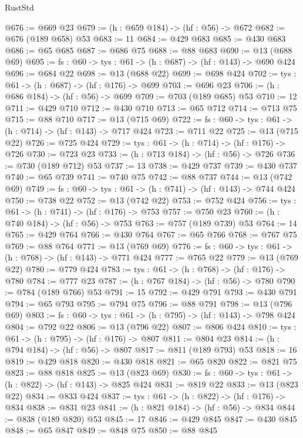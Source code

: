 \begin{lexlean}{RustStd}
\begin{coremodule}
@676 := @669 @23
@679 := (h : @659 @184) -> (hf : @56) -> @672
@682 := @676 (@189 @658) @53
@683 := 11
@684 := @429 @683
@685 := @430 @683
@686 := @65 @685
@687 := @686 @75
@688 := @88 @683
@690 := @13 (@688 @69)
@695 := {fs : @60} -> {tys : @61} -> (h : @687) -> (hf : @143) -> @690 @424
@696 := @684 @22
@698 := @13 (@688 @22)
@699 := @698 @424
@702 := {tys : @61} -> (h : @687) -> (hf : @176) -> @699
@703 := @696 @23
@706 := (h : @686 @184) -> (hf : @56) -> @699
@709 := @703 (@189 @685) @53
@710 := 12
@711 := @429 @710
@712 := @430 @710
@713 := @65 @712
@714 := @713 @75
@715 := @88 @710
@717 := @13 (@715 @69)
@722 := {fs : @60} -> {tys : @61} -> (h : @714) -> (hf : @143) -> @717 @424
@723 := @711 @22
@725 := @13 (@715 @22)
@726 := @725 @424
@729 := {tys : @61} -> (h : @714) -> (hf : @176) -> @726
@730 := @723 @23
@733 := (h : @713 @184) -> (hf : @56) -> @726
@736 := @730 (@189 @712) @53
@737 := 13
@738 := @429 @737
@739 := @430 @737
@740 := @65 @739
@741 := @740 @75
@742 := @88 @737
@744 := @13 (@742 @69)
@749 := {fs : @60} -> {tys : @61} -> (h : @741) -> (hf : @143) -> @744 @424
@750 := @738 @22
@752 := @13 (@742 @22)
@753 := @752 @424
@756 := {tys : @61} -> (h : @741) -> (hf : @176) -> @753
@757 := @750 @23
@760 := (h : @740 @184) -> (hf : @56) -> @753
@763 := @757 (@189 @739) @53
@764 := 14
@765 := @429 @764
@766 := @430 @764
@767 := @65 @766
@768 := @767 @75
@769 := @88 @764
@771 := @13 (@769 @69)
@776 := {fs : @60} -> {tys : @61} -> (h : @768) -> (hf : @143) -> @771 @424
@777 := @765 @22
@779 := @13 (@769 @22)
@780 := @779 @424
@783 := {tys : @61} -> (h : @768) -> (hf : @176) -> @780
@784 := @777 @23
@787 := (h : @767 @184) -> (hf : @56) -> @780
@790 := @784 (@189 @766) @53
@791 := 15
@792 := @429 @791
@793 := @430 @791
@794 := @65 @793
@795 := @794 @75
@796 := @88 @791
@798 := @13 (@796 @69)
@803 := {fs : @60} -> {tys : @61} -> (h : @795) -> (hf : @143) -> @798 @424
@804 := @792 @22
@806 := @13 (@796 @22)
@807 := @806 @424
@810 := {tys : @61} -> (h : @795) -> (hf : @176) -> @807
@811 := @804 @23
@814 := (h : @794 @184) -> (hf : @56) -> @807
@817 := @811 (@189 @793) @53
@818 := 16
@819 := @429 @818
@820 := @430 @818
@821 := @65 @820
@822 := @821 @75
@823 := @88 @818
@825 := @13 (@823 @69)
@830 := {fs : @60} -> {tys : @61} -> (h : @822) -> (hf : @143) -> @825 @424
@831 := @819 @22
@833 := @13 (@823 @22)
@834 := @833 @424
@837 := {tys : @61} -> (h : @822) -> (hf : @176) -> @834
@838 := @831 @23
@841 := (h : @821 @184) -> (hf : @56) -> @834
@844 := @838 (@189 @820) @53
@845 := 17
@846 := @429 @845
@847 := @430 @845
@848 := @65 @847
@849 := @848 @75
@850 := @88 @845

\end{coremodule}
\end{lexlean}
